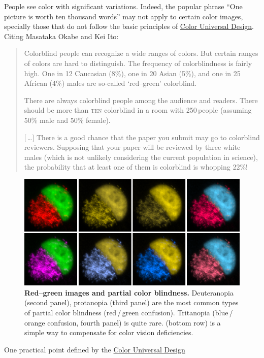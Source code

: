 People see color with significant variations. Indeed, the popular
phrase ``One picture is worth ten thousand words'' may not apply
to certain color images, specially those that do not follow the basic
principles of \href{http://jfly.iam.u-tokyo.ac.jp/color/}{Color Universal Design}.
Citing Masataka Okabe and Kei Ito:
\begin{quotation}
Colorblind people can recognize a wide ranges
of colors. But certain ranges of colors are hard to distinguish. The
frequency of colorblindness is fairly high. One in 12 Caucasian (8\%),
one in 20 Asian (5\%), and one in 25 African (4\%) males are so-called
`red--green' colorblind.

There are always colorblind people among the audience and readers.
There should be more than \textsc{ten} colorblind in a room with 250\,people
(assuming 50\% male and 50\% {\small female}).

{[}\,\ldots{}{]} There is a good chance that the paper you submit
may go to colorblind reviewers. Supposing that your paper will be
reviewed by three white males (which is not unlikely considering the
current population in science), the probability that at least one
of them is colorblind is whopping 22\%! 
\end{quotation}
\begin{figure}
\noindent \includegraphics[width=1\columnwidth]{images/Dichromacy}\caption[Red--green images and partial color blindness]{\textbf{\label{fig:ColorBlindness}Red--green images and partial
color blindness.} Deuteranopia (second panel), protanopia (third panel)
are the most common types of partial color blindness (red\,/\,green
confusion). Tritanopia (blue\,/\,orange confusion, fourth panel)
is quite rare.  (bottom
row) is a simple way to compensate for color vision deficiencies.}
\end{figure}
One practical point defined by the \href{http://jfly.iam.u-tokyo.ac.jp/color/}{Color Universal Design}
